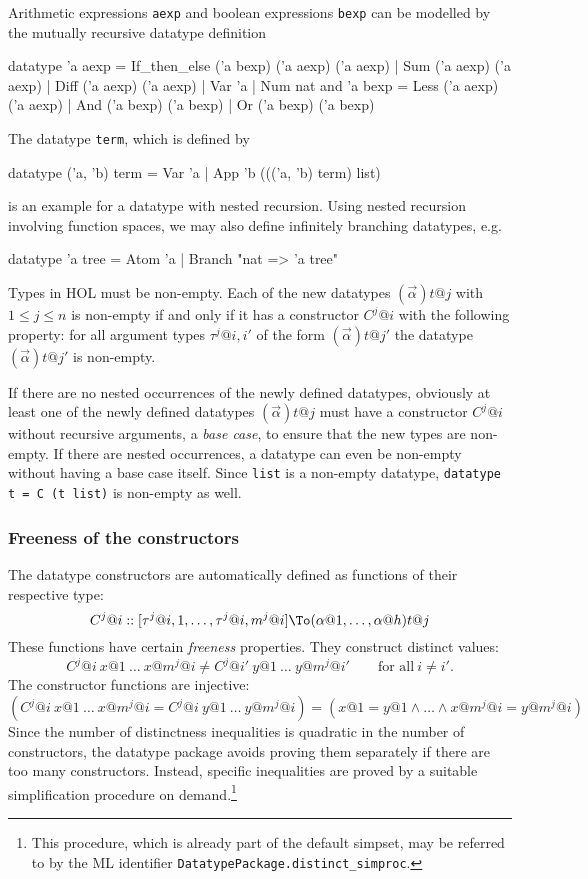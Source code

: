 Arithmetic expressions \texttt{aexp} and boolean expressions \texttt{bexp} can be modelled
by the mutually recursive datatype definition
\begin{ttbox}
datatype 'a aexp = If_then_else ('a bexp) ('a aexp) ('a aexp)
                 | Sum ('a aexp) ('a aexp)
                 | Diff ('a aexp) ('a aexp)
                 | Var 'a
                 | Num nat
and      'a bexp = Less ('a aexp) ('a aexp)
                 | And ('a bexp) ('a bexp)
                 | Or ('a bexp) ('a bexp)
\end{ttbox}
The datatype \texttt{term}, which is defined by
\begin{ttbox}
datatype ('a, 'b) term = Var 'a
                       | App 'b ((('a, 'b) term) list)
\end{ttbox}
is an example for a datatype with nested recursion. Using nested recursion
involving function spaces, we may also define infinitely branching datatypes, e.g.
\begin{ttbox}
datatype 'a tree = Atom 'a | Branch "nat => 'a tree"
\end{ttbox}

\medskip

Types in HOL must be non-empty. Each of the new datatypes
$(\vec{\alpha})t@j$ with $1 \leq j \leq n$ is non-empty if and only if it has a
constructor $C^j@i$ with the following property: for all argument types
$\tau^j@{i,i'}$ of the form $(\vec{\alpha})t@{j'}$ the datatype
$(\vec{\alpha})t@{j'}$ is non-empty.

If there are no nested occurrences of the newly defined datatypes, obviously
at least one of the newly defined datatypes $(\vec{\alpha})t@j$
must have a constructor $C^j@i$ without recursive arguments, a \emph{base
  case}, to ensure that the new types are non-empty. If there are nested
occurrences, a datatype can even be non-empty without having a base case
itself. Since \texttt{list} is a non-empty datatype, \texttt{datatype t = C (t
  list)} is non-empty as well.


\subsubsection{Freeness of the constructors}

The datatype constructors are automatically defined as functions of their
respective type:
\[ C^j@i :: [\tau^j@{i,1},\dots,\tau^j@{i,m^j@i}] \To (\alpha@1,\dots,\alpha@h)t@j \]
These functions have certain {\em freeness} properties.  They construct
distinct values:
\[
C^j@i~x@1~\dots~x@{m^j@i} \neq C^j@{i'}~y@1~\dots~y@{m^j@{i'}} \qquad
\mbox{for all}~ i \neq i'.
\]
The constructor functions are injective:
\[
(C^j@i~x@1~\dots~x@{m^j@i} = C^j@i~y@1~\dots~y@{m^j@i}) =
(x@1 = y@1 \land \dots \land x@{m^j@i} = y@{m^j@i})
\]
Since the number of distinctness inequalities is quadratic in the number of
constructors, the datatype package avoids proving them separately if there are
too many constructors. Instead, specific inequalities are proved by a suitable
simplification procedure on demand.\footnote{This procedure, which is already part
of the default simpset, may be referred to by the ML identifier
\texttt{DatatypePackage.distinct_simproc}.}

